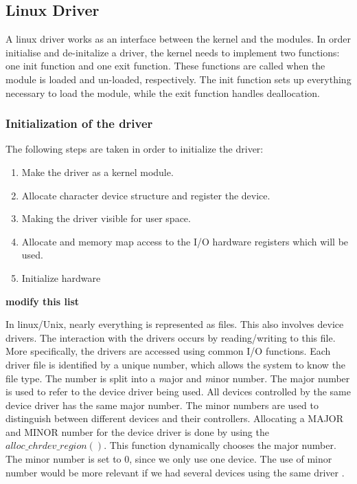 \subsection{Linux Driver}
A linux driver works as an interface between the kernel and the modules. In order initialise and de-initalize a driver, the kernel needs to implement two functions: one init function and one exit function. These functions are called when the module is loaded and un-loaded, respectively. The init function sets up everything necessary to load the module, while the exit function handles deallocation. 


\subsubsection{Initialization of the driver}

The following steps are taken in order to initialize the driver:

\begin{enumerate}
    \item Make the driver as a kernel module.
    \item Allocate character device structure and register the device. 
    \item Making the driver visible for user space.
    \item Allocate and memory map access to the I/O hardware registers which will be used. 
    \item Initialize hardware
\end{enumerate}

{\bf modify this list}

In linux/Unix, nearly everything is represented as files. This also involves device drivers. The interaction with the drivers occurs by reading/writing to this file. More specifically, the drivers are accessed using common I/O functions. Each driver file is identified by a unique number, which allows the system to know the file type. The number is split into a \emph major and \emph minor number. The major number is used to refer to the device driver being used. All devices controlled by the same device driver has the same major number. The minor numbers are used to distinguish between different devices and their controllers. Allocating a MAJOR and MINOR number for the device driver is done by using the $alloc\_chrdev\_region()$. This function dynamically chooses the major number. The minor number is set to 0, since we only use one device. The use of minor number would be more relevant if we had several devices using the same driver \cite{linux}. 

